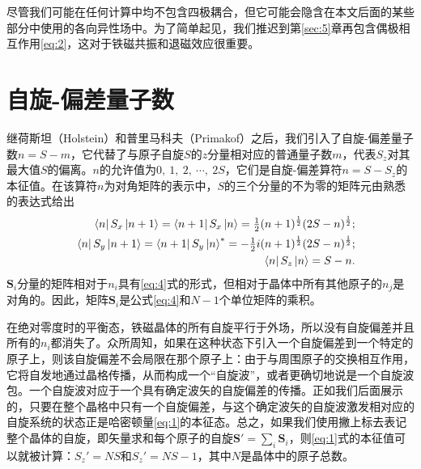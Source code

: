 \documentclass{article}
\begin{document}
尽管我们可能在任何计算中均不包含四极耦合，但它可能会隐含在本文后面的某些部分中使用的各向异性场中。为了简单起见，我们推迟到第\ref{sec:5}章再包含偶极相互作用\eqref{eq:2}，这对于铁磁共振和退磁效应很重要。




\section{自旋-偏差量子数} \label{sec:2}

继荷斯坦（Holstein）和普里马科夫（Primakof）之后，我们引入了自旋-偏差量子数$n=S-m$，它代替了与原子自旋$S$的$z$分量相对应的普通量子数$m$，代表$S_z$对其最大值$S$的偏离。$n$的允许值为$0,~1,~2,~\cdots,~2S$，它们是自旋-偏差算符$n=S-S_z$的本征值。在该算符$n$为对角矩阵的表示中，$S$的三个分量的不为零的矩阵元由熟悉的表达式给出
\begin{eqnarray} \label{eq:4}
&&\bra{n}S_x\ket{n+1}=\bra{n+1}S_x\ket{n}=\tfrac{1}{2}(n+1)^{\frac{1}{2}}(2S-n)^{\frac{1}{2}};\nonumber\\
&&\bra{n}S_y\ket{n+1}=\bra{n+1}S_y\ket{n}^*=-\tfrac{1}{2}i(n+1)^{\frac{1}{2}}(2S-n)^{\frac{1}{2}};\\
&&\phantom{***}\bra{n}S_z\ket{n}=S-n.\nonumber
\end{eqnarray}
$\mathbf{S}_i$分量的矩阵相对于$n_i$具有\eqref{eq:4}式的形式，但相对于晶体中所有其他原子的$n_j$是对角的。因此，矩阵$\mathbf{S}_i$是公式\eqref{eq:4}和$N-1$个单位矩阵的乘积。

在绝对零度时的平衡态，铁磁晶体的所有自旋平行于外场，所以没有自旋偏差并且所有的$n_i$都消失了。众所周知，如果在这种状态下引入一个自旋偏差到一个特定的原子上，则该自旋偏差不会局限在那个原子上：由于与周围原子的交换相互作用，它将自发地通过晶格传播，从而构成一个“自旋波”，或者更确切地说是一个自旋波包。一个自旋波对应于一个具有确定波矢的自旋偏差的传播。正如我们后面展示的，只要在整个晶格中只有一个自旋偏差，与这个确定波矢的自旋波激发相对应的自旋系统的状态正是哈密顿量\eqref{eq:1}的本征态。总之，如果我们使用撇上标去表记整个晶体的自旋，即矢量求和每个原子的自旋$\mathbf{S}'=\sum_i\mathbf{S}_i$，则\eqref{eq:1}式的本征值可以就被计算：$S_z'=NS$和$S_z'=NS-1$，其中$N$是晶体中的原子总数。
\end{document}
